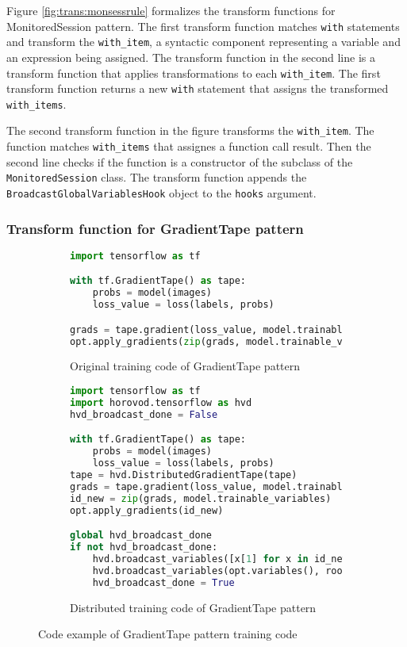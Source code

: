 Figure \ref{fig:trans:monsessrule} formalizes the transform functions for
MonitoredSession pattern.
The first transform function matches {\tt with} statements and transform
the {\tt with\_item}, a syntactic component representing 
a variable and an expression being assigned.
The transform function \fkwwithitem in the second line is a 
transform function that applies transformations to each {\tt with\_item}.
The first transform function returns a new {\tt with} statement 
that assigns the transformed {\tt with\_items}.

The second transform function in the figure transforms the {\tt with\_item}.
The function matches {\tt with\_items} that assignes a function call result.
Then the second line checks if the function is a constructor
of the subclass of the {\tt MonitoredSession} class. 
The transform function appends the {\tt BroadcastGlobalVariablesHook} object 
to the {\tt hooks} argument.
   

\pagebreak

\subsubsection{Transform function for GradientTape pattern}

\begin{figure}[ht!]
  \centering
  \begin{subfigure}[t]{0.45\textwidth}
    \begin{lstlisting}[language=Python]
import tensorflow as tf

with tf.GradientTape() as tape:
    probs = model(images)
    loss_value = loss(labels, probs)

grads = tape.gradient(loss_value, model.trainable_variables)
opt.apply_gradients(zip(grads, model.trainable_variables))
    \end{lstlisting}
    \caption{Original training code of GradientTape pattern}
  \end{subfigure}
  \hspace{5mm}
  \begin{subfigure}[t]{0.45\textwidth}
    \begin{lstlisting}[language=Python]
import tensorflow as tf
import horovod.tensorflow as hvd
hvd_broadcast_done = False

with tf.GradientTape() as tape:
    probs = model(images)
    loss_value = loss(labels, probs)
tape = hvd.DistributedGradientTape(tape)
grads = tape.gradient(loss_value, model.trainable_variables)
id_new = zip(grads, model.trainable_variables)
opt.apply_gradients(id_new)

global hvd_broadcast_done
if not hvd_broadcast_done:
    hvd.broadcast_variables([x[1] for x in id_new], root_rank=0, )
    hvd.broadcast_variables(opt.variables(), root_rank=0, )
    hvd_broadcast_done = True
    \end{lstlisting}
    \caption{Distributed training code of GradientTape pattern}
  \end{subfigure}
  \caption{Code example of GradientTape pattern training code}
  \label{fig:trans:gtapetrans}
\end{figure}


